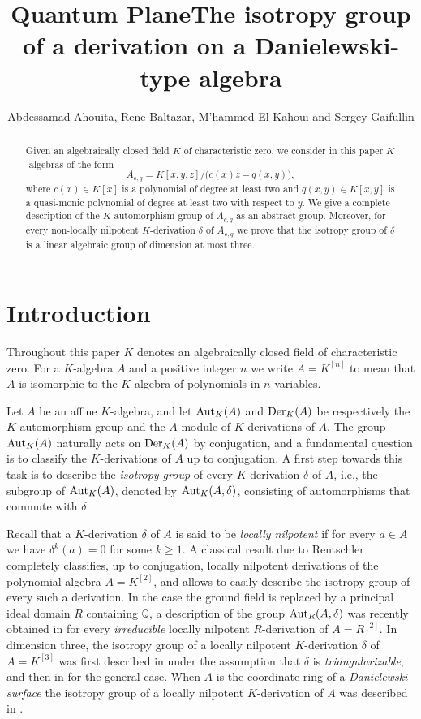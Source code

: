 \documentclass{article}
\title{Quantum Plane}
\title{\textbf{\LARGE The isotropy group of a derivation on a Danielewski-type algebra}}
\author{ \small
Abdessamad Ahouita, Rene Baltazar, M'hammed El Kahoui and Sergey Gaifullin}
\date{\vspace{-5ex}}
\newcommand \Q {\mathbb{Q}}
\renewcommand \a {A}
\newcommand \ring {R}
\renewcommand \k {K}
\newcommand \der {{\rm Der}}
\newcommand \auto {{\rm Aut}}
\begin{document}
\Large{
\maketitle

\begin{abstract}Given an algebraically closed field $\k$ of characteristic zero, we consider in this paper $\k$-algebras of the form $$\a_{c,q}=\k[x,y,z]/\big(c(x)z-q(x,y)\big),$$ where $c(x)\in\k[x]$ is a polynomial of degree at least two and $q(x,y)\in\k[x,y]$ is a quasi-monic polynomial of degree at least two with respect to $y$. We give a complete description of the $\k$-automorphism group of $\a_{c,q}$ as an abstract group. Moreover, for every non-locally nilpotent $\k$-derivation $\delta$ of $\a_{c,q}$ we prove that the isotropy group of $\delta$ is a linear algebraic group of dimension at most three.

\end{abstract}


\section{Introduction}\label{sec:intro}
Throughout this paper $\k$ denotes an algebraically closed field of characteristic zero. For a $\k$-algebra $\a$ and a positive integer $n$ we write $\a=\k^{[n]}$ to mean that $\a$ is isomorphic to the $\k$-algebra of polynomials in $n$ variables.

\medskip Let $\a$ be an affine $\k$-algebra, and let $\auto_{\k}(\a)$ and $\der_{\k}(\a)$ be respectively the $\k$-automorphism group and the $\a$-module of $\k$-derivations of $\a$. The group $\auto_{\k}(\a)$ naturally acts on $\der_{\k}(\a)$ by conjugation, and a fundamental question is to classify the $\k$-derivations of $\a$ up to conjugation. A first step towards this task is to describe the {\it isotropy group} of every $\k$-derivation $\delta$ of $\a$, i.e., the subgroup of $\auto_{\k}(\a)$, denoted by $\auto_{\k}(\a,\delta)$, consisting of automorphisms that commute with $\delta$.

\medskip Recall that a $\k$-derivation $\delta$ of $\a$ is said to be {\it locally nilpotent} if for every $a\in\a$ we have $\delta^{k}(a)=0$ for some $k\geq 1$. A classical result due to Rentschler \cite{Rentschler_68} completely classifies, up to conjugation, locally nilpotent derivations of the polynomial algebra $\a=\k^{[2]}$, and allows to easily describe the isotropy group of every such a derivation. In the case the ground field is replaced by a principal ideal domain $\ring$ containing $\Q$, a description of the group $\auto_{\ring}(\a,\delta)$ was recently obtained in \cite{elkahoui25} for every {\it irreducible} locally nilpotent $\ring$-derivation of $\a=\ring^{[2]}$. In dimension three, the isotropy group of a locally nilpotent $\k$-derivation $\delta$ of $\a=\k^{[3]}$ was first described in \cite{finstonWalcher97} under the assumption that $\delta$ is {\it triangularizable}, and then in \cite{stampfli_2014} for the general case. When $\a$ is the coordinate ring of a {\it Danielewski surface} \cite{danielewski_89} the isotropy group of a locally nilpotent $\k$-derivation of $\a$ was described in \cite{baltazarVeloso2020,dasguptaLahiri_2023}.

}
\end{document}
